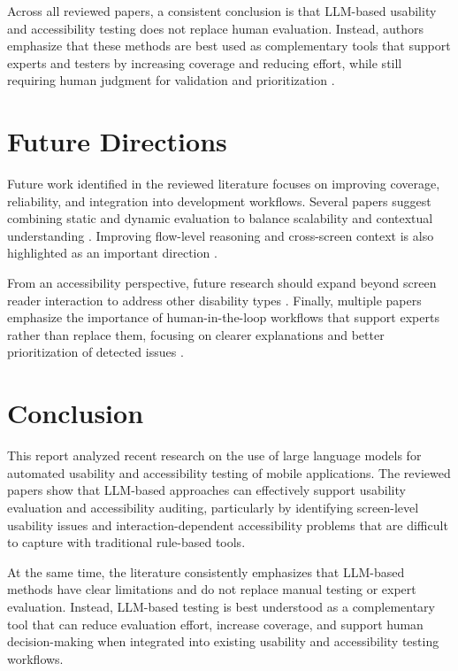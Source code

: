 \documentclass[acmsmall,nonacm]{acmart}
\begin{document}
Across all reviewed papers, a consistent conclusion is that LLM-based usability and accessibility testing does not replace human evaluation. Instead, authors emphasize that these methods are best used as complementary tools that support experts and testers by increasing coverage and reducing effort, while still requiring human judgment for validation and prioritization \cite{xiang2023simuser,zhong2023synthetic_heuristic,zhong2024screenaudit,wang2024aiheureval,yang2023uisgpt,aljedaani2024llm_accessibility}.

\section{Future Directions}

Future work identified in the reviewed literature focuses on improving coverage, reliability, and integration into development workflows. Several papers suggest combining static and dynamic evaluation to balance scalability and contextual understanding \cite{zhong2023synthetic_heuristic,zhong2024screenaudit,wang2024aiheureval}. Improving flow-level reasoning and cross-screen context is also highlighted as an important direction \cite{hsueh2023llm_ux_testing}.

From an accessibility perspective, future research should expand beyond screen reader interaction to address other disability types \cite{zhong2024screenaudit,aljedaani2024llm_accessibility}. Finally, multiple papers emphasize the importance of human-in-the-loop workflows that support experts rather than replace them, focusing on clearer explanations and better prioritization of detected issues \cite{xiang2023simuser,zhong2023synthetic_heuristic,zhong2024screenaudit,wang2024aiheureval,yang2023uisgpt,aljedaani2024llm_accessibility}.

\section{Conclusion}

This report analyzed recent research on the use of large language models for automated usability and accessibility testing of mobile applications. The reviewed papers show that LLM-based approaches can effectively support usability evaluation and accessibility auditing, particularly by identifying screen-level usability issues and interaction-dependent accessibility problems that are difficult to capture with traditional rule-based tools.

At the same time, the literature consistently emphasizes that LLM-based methods have clear limitations and do not replace manual testing or expert evaluation. Instead, LLM-based testing is best understood as a complementary tool that can reduce evaluation effort, increase coverage, and support human decision-making when integrated into existing usability and accessibility testing workflows.



\end{document}
